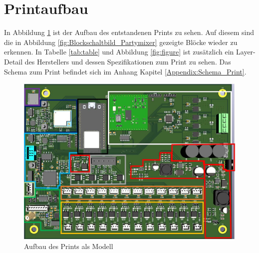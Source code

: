 \newpage
\section{Printaufbau}
\label{sec:Printaufbau}

In Abbildung \ref{fig:Print_3D} ist der Aufbau des entstandenen Prints zu sehen. Auf diesem sind die in Abbildung  \ref{fig:Blockschaltbild_Partymixer} gezeigte Blöcke wieder zu erkennen. In Tabelle \ref{tab:table} und Abbildung \ref{fig:figure} ist zusätzlich ein Layer-Detail des Herstellers und dessen Spezifikationen zum Print zu sehen. Das Schema zum Print befindet sich im Anhang Kapitel \ref{Appendix:Schema_Print}.

\begin{figure}[H]
	\centering
	\includegraphics[width=\textwidth]{graphics/Printteile}
	\caption{Aufbau des Prints als Modell}
	\label{fig:Print_3D}
\end{figure} 

